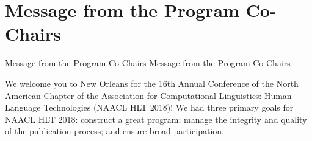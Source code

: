 \section{Message from the Program Co-Chairs}\vspace{2em}
\setheaders%
    {Message from the Program Co-Chairs}%
    {Message from the Program Co-Chairs}
\thispagestyle{emptyheader}

\setlength{\parskip}{.7ex}


We welcome you to New Orleans for the 16th Annual Conference of the North American Chapter of the Association for Computational Linguistics: Human Language Technologies (NAACL HLT 2018)! We had three primary goals for NAACL HLT 2018: construct a great program; manage the integrity and quality of the publication process; and ensure broad participation.

